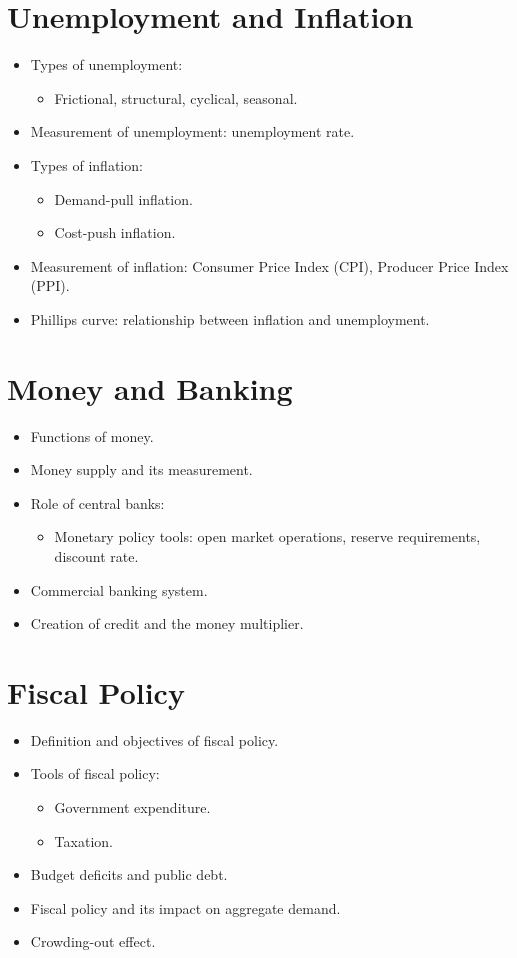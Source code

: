 \section{Unemployment and Inflation}
\begin{itemize}
    \item Types of unemployment:
    \begin{itemize}
        \item Frictional, structural, cyclical, seasonal.
    \end{itemize}
    \item Measurement of unemployment: unemployment rate.
    \item Types of inflation:
    \begin{itemize}
        \item Demand-pull inflation.
        \item Cost-push inflation.
    \end{itemize}
    \item Measurement of inflation: Consumer Price Index (CPI), Producer Price Index (PPI).
    \item Phillips curve: relationship between inflation and unemployment.
\end{itemize}

\section{Money and Banking}
\begin{itemize}
    \item Functions of money.
    \item Money supply and its measurement.
    \item Role of central banks:
    \begin{itemize}
        \item Monetary policy tools: open market operations, reserve requirements, discount rate.
    \end{itemize}
    \item Commercial banking system.
    \item Creation of credit and the money multiplier.
\end{itemize}

\section{Fiscal Policy}
\begin{itemize}
    \item Definition and objectives of fiscal policy.
    \item Tools of fiscal policy:
    \begin{itemize}
        \item Government expenditure.
        \item Taxation.
    \end{itemize}
    \item Budget deficits and public debt.
    \item Fiscal policy and its impact on aggregate demand.
    \item Crowding-out effect.
\end{itemize}

